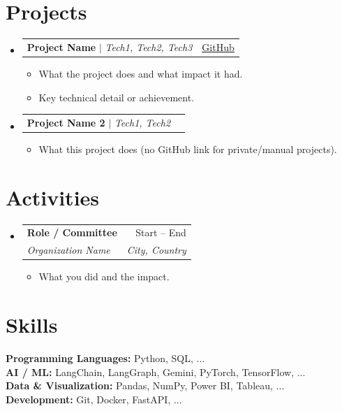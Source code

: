 \documentclass[letterpaper,10pt]{article}
\makeatletter
\newcommand{\resumeItem}[1]{
  \item\small{
    {#1 \vspace{-2pt}}
  }
}
\newcommand{\resumeSubheading}[4]{
  \vspace{-2pt}\item
    \begin{tabular*}{0.97\textwidth}[t]{l@{\extracolsep{\fill}}r}
      \textbf{#1} & #2 \\
      \textit{\small #3} & \textit{\small #4} \\
    \end{tabular*}\vspace{-7pt}
}
\newcommand{\resumeProjectHeading}[2]{
    \item
    \begin{tabular*}{0.97\textwidth}{l@{\extracolsep{\fill}}r}
      #1 & #2 \\
    \end{tabular*}\vspace{-7pt}
}
\newcommand{\resumeSubHeadingListStart}{\begin{itemize}[leftmargin=0.15in, label={}]}
\newcommand{\resumeSubHeadingListEnd}{\end{itemize}}
\newcommand{\resumeItemListStart}{\begin{itemize}}
\newcommand{\resumeItemListEnd}{\end{itemize}\vspace{-5pt}}
\makeatother
\begin{document}
\section{Projects}
    \resumeSubHeadingListStart

      \resumeProjectHeading
          {\textbf{Project Name} $|$ \textit{Tech1, Tech2, Tech3}}{\href{https://github.com/you/repo}{\underline{GitHub}}}
          \resumeItemListStart
            \resumeItem{What the project does and what impact it had.}
            \resumeItem{Key technical detail or achievement.}
          \resumeItemListEnd

      \resumeProjectHeading
          {\textbf{Project Name 2} $|$ \textit{Tech1, Tech2}}{}
          \resumeItemListStart
            \resumeItem{What this project does (no GitHub link for private/manual projects).}
          \resumeItemListEnd

    \resumeSubHeadingListEnd

\section{Activities}
  \resumeSubHeadingListStart
    \resumeSubheading
      {Role / Committee}{Start -- End}
      {Organization Name}{City, Country}
      \resumeItemListStart
        \resumeItem{What you did and the impact.}
      \resumeItemListEnd
  \resumeSubHeadingListEnd

\section{Skills}
\begin{itemize}[leftmargin=0.15in, label={}]
    \small{\item{
     \textbf{Programming Languages:}{ Python, SQL, ...} \\
     \textbf{AI / ML:}{ LangChain, LangGraph, Gemini, PyTorch, TensorFlow, ...} \\
     \textbf{Data \& Visualization:}{ Pandas, NumPy, Power BI, Tableau, ...} \\
     \textbf{Development:}{ Git, Docker, FastAPI, ...}
    }}
\end{itemize}

\end{document}
